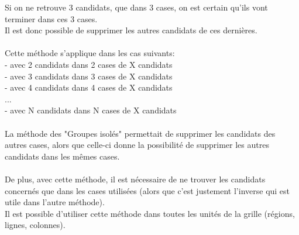 Si on ne retrouve 3 candidats, que dans 3 cases, on est certain qu'ils vont terminer dans ces 3 cases.\\ 
Il est donc possible de supprimer les autres candidats de ces dernières.\\
\\
Cette méthode s'applique dans les cas suivants:\\
- avec 2 candidats dans 2 cases de X candidats\\
- avec 3 candidats dans 3 cases de X candidats\\
- avec 4 candidats dans 4 cases de X candidats\\
...\\
- avec N candidats dans N cases de X candidats\\
\\
La méthode des "Groupes isolés" permettait de supprimer les candidats des autres cases, 
alors que celle-ci donne la possibilité de supprimer les autres candidats dans les mêmes cases.\\
\\
De plus, avec cette méthode, il est nécessaire de ne trouver les candidats concernés que dans 
les cases utilisées (alors que c'est justement l'inverse qui est utile dans l'autre méthode).\\
Il est possible d'utiliser cette méthode dans toutes les unités de la grille (régions, lignes, colonnes).




